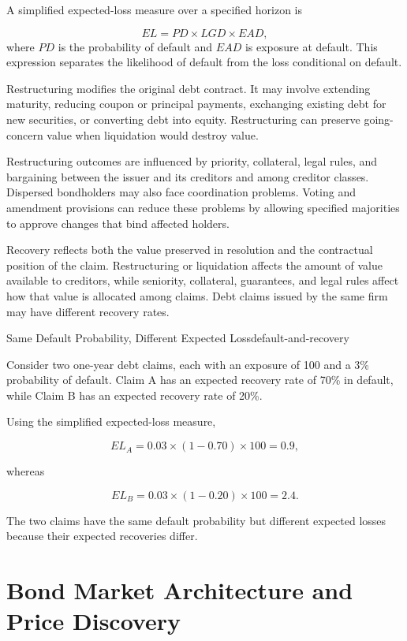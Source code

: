 A simplified expected-loss measure over a specified horizon is

\begin{equation}
EL=PD\times LGD\times EAD,
\label{eq:ch8-expected-credit-loss}
\end{equation}
where $PD$ is the probability of default and $EAD$ is exposure at default. This expression separates the likelihood of default from the loss conditional on default.

Restructuring modifies the original debt contract. It may involve extending maturity, reducing coupon or principal payments, exchanging existing debt for new securities, or converting debt into equity. Restructuring can preserve going-concern value when liquidation would destroy value.

Restructuring outcomes are influenced by priority, collateral, legal rules, and bargaining between the issuer and its creditors and among creditor classes. Dispersed bondholders may also face coordination problems. Voting and amendment provisions can reduce these problems by allowing specified majorities to approve changes that bind affected holders.

Recovery reflects both the value preserved in resolution and the contractual position of the claim. Restructuring or liquidation affects the amount of value available to creditors, while seniority, collateral, guarantees, and legal rules affect how that value is allocated among claims. Debt claims issued by the same firm may have different recovery rates.

\begin{example}{Same Default Probability, Different Expected Loss}{default-and-recovery}

Consider two one-year debt claims, each with an exposure of 100 and a 3\% probability of default. Claim A has an expected recovery rate of 70\% in default, while Claim B has an expected recovery rate of 20\%.

Using the simplified expected-loss measure,

\[
EL_A=0.03\times(1-0.70)\times100=0.9,
\]

whereas

\[
EL_B=0.03\times(1-0.20)\times100=2.4.
\]

The two claims have the same default probability but different expected losses because their expected recoveries differ.

\end{example}

\section{Bond Market Architecture and Price Discovery}

